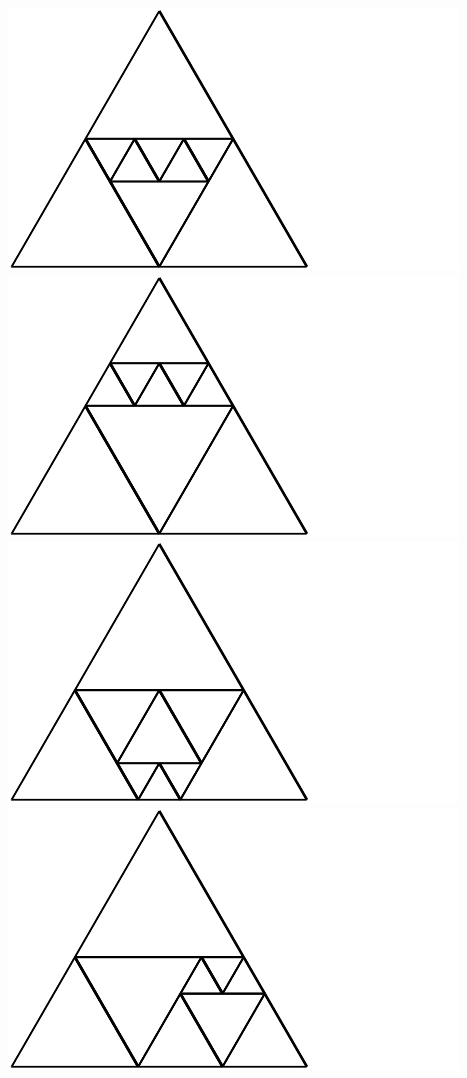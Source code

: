 \documentclass[12pt,amstags,fleqn]{article}
\theoremstyle{plain}
\theoremstyle{definition}
\begin{document}
\includegraphics{output-dissections-dissection9_i11_r1_c0.pdf}
\includegraphics{output-dissections-dissection9_i11_r1_c3.pdf}
\includegraphics{output-dissections-dissection9_i13_r2_c1.pdf}
\includegraphics{output-dissections-dissection9_i13_r2_c3.pdf}
\end{document}
